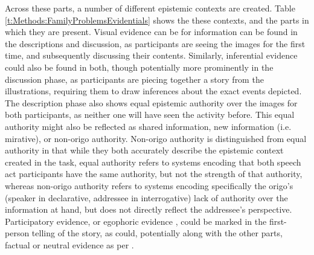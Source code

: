 Across these parts, a number of different epistemic contexts are created. Table \ref{t:Methods:FamilyProblemsEvidentials} shows the these contexts, and the parts in which they are present. Visual evidence can be for information can be found in the descriptions and discussion, as participants are seeing the images for the first time, and subsequently discussing their contents. Similarly, inferential evidence could also be found in both, though potentially more prominently in the discussion phase, as participants are piecing together a story from the illustrations, requiring them to draw inferences about the exact events depicted. The description phase also shows equal epistemic authority over the images for both participants, as neither one will have seen the activity before. This equal authority might also be reflected as shared information, new information (i.e. mirative), or non-origo authority. Non-origo authority is distinguished from equal authority in that while they both accurately describe the epistemic context created in the task, equal authority refers to systems encoding that both speech act participants have the same authority, but not the strength of that authority, whereas non-origo authority refers to systems encoding specifically the origo's (speaker in declarative, addressee in interrogative) lack of authority over the information at hand, but does not directly reflect the addressee's perspective. Participatory evidence, or egophoric evidence \cite[][see ]{Gawne2017}, could be marked in the first-person telling of the story, as could, potentially along with the other parts, factual or neutral evidence as per .

\begin{table}  
  \noindent{}
  \caption{Epistemic contexts covered by each part of the Family Problems Picture Task}\label{t:Methods:FamilyProblemsEvidentials}
\end{table}


